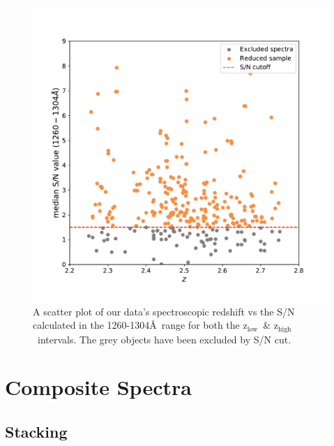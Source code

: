 \documentclass[twocolumn,tight,times]{aastex63}
\newcommand{\hiz}{$\mathrm{z_{high}}$}
\newcommand{\loz}{$\mathrm{z_{low}}$}
\begin{document}
\begin{figure}[ht]
    \begin{center}
    \includegraphics[width=\columnwidth]{s2n_hist.pdf}
    \caption{A scatter plot of our data's spectroscopic redshift vs the S/N calculated in the 1260-1304\AA\ range for both the \loz\ \& \hiz\ intervals. The grey objects have been excluded by S/N cut.} 
    \label{fig:noise_scatter}
    \end{center}
\end{figure}

\section{Composite Spectra}
\label{sec:composite}

\subsection{Stacking}
\label{subsec:stack}
\end{document}
